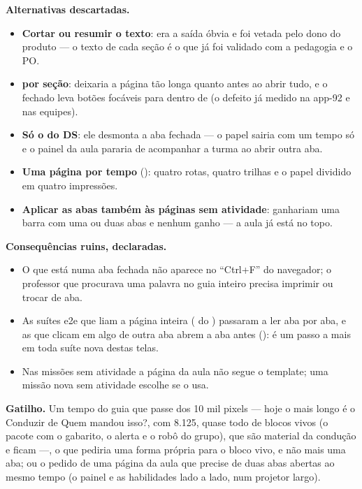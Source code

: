 \textbf{Alternativas descartadas.}

\begin{itemize}
  \item \textbf{Cortar ou resumir o texto}: era a saída óbvia e foi vetada pelo
    dono do produto --- o texto de cada seção é o que já foi validado com a
    pedagogia e o PO.
  \item \textbf{ por seção}: deixaria a página tão longa quanto
    antes ao abrir tudo, e o fechado leva botões focáveis para dentro de
     (o defeito já medido na app-92 e nas equipes).
  \item \textbf{Só o  do DS}: ele desmonta a aba fechada --- o
    papel sairia com um tempo só e o painel da aula pararia de acompanhar a
    turma ao abrir outra aba.
  \item \textbf{Uma página por tempo} (): quatro rotas,
    quatro trilhas e o papel dividido em quatro impressões.
  \item \textbf{Aplicar as abas também às páginas sem atividade}: ganhariam
    uma barra com uma ou duas abas e nenhum ganho --- a aula já está no topo.
\end{itemize}

\textbf{Consequências ruins, declaradas.}

\begin{itemize}
  \item O que está numa aba fechada não aparece no \enquote{Ctrl+F} do
    navegador; o professor que procurava uma palavra no guia inteiro precisa
    imprimir ou trocar de aba.
  \item As suítes e2e que liam a página inteira ( do
    ) passaram a ler aba por aba, e as que clicam em algo de outra
    aba abrem a aba antes (): é um passo a mais
    em toda suíte nova destas telas.
  \item Nas missões sem atividade a página da aula não segue o template; uma
    missão nova sem atividade escolhe se o usa.
\end{itemize}

\textbf{Gatilho.} Um tempo do guia que passe dos 10 mil pixels --- hoje o
mais longo é o Conduzir de Quem mandou isso?, com 8.125, quase todo de blocos
vivos (o pacote com o gabarito, o alerta e o robô do grupo), que são material
da condução e ficam ---, o que pediria uma forma própria para o bloco vivo, e
não mais uma aba; ou o pedido de uma
página da aula que precise de duas abas abertas ao mesmo tempo (o painel e as
habilidades lado a lado, num projetor largo).


